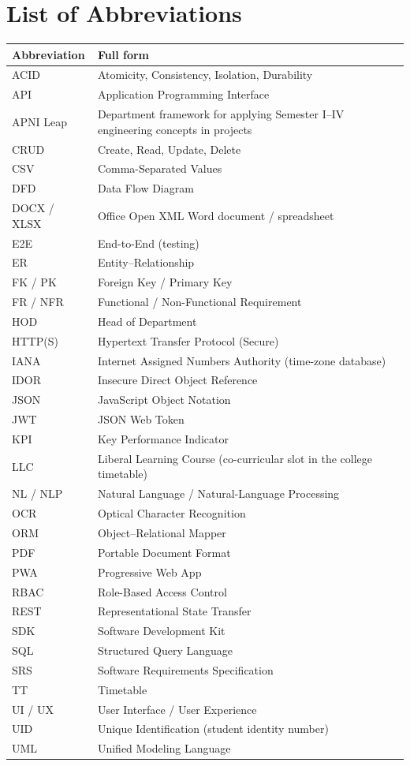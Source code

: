 \section*{List of Abbreviations}
\begin{longtable}{@{}p{}p{}@{}}
\toprule
\textbf{Abbreviation} & \textbf{Full form}\\
\midrule
\endhead
ACID & Atomicity, Consistency, Isolation, Durability\\
API & Application Programming Interface\\
APNI Leap & Department framework for applying Semester I--IV engineering concepts in projects\\
CRUD & Create, Read, Update, Delete\\
CSV & Comma-Separated Values\\
DFD & Data Flow Diagram\\
DOCX / XLSX & Office Open XML Word document / spreadsheet\\
E2E & End-to-End (testing)\\
ER & Entity--Relationship\\
FK / PK & Foreign Key / Primary Key\\
FR / NFR & Functional / Non-Functional Requirement\\
HOD & Head of Department\\
HTTP(S) & Hypertext Transfer Protocol (Secure)\\
IANA & Internet Assigned Numbers Authority (time-zone database)\\
IDOR & Insecure Direct Object Reference\\
JSON & JavaScript Object Notation\\
JWT & JSON Web Token\\
KPI & Key Performance Indicator\\
LLC & Liberal Learning Course (co-curricular slot in the college timetable)\\
NL / NLP & Natural Language / Natural-Language Processing\\
OCR & Optical Character Recognition\\
ORM & Object--Relational Mapper\\
PDF & Portable Document Format\\
PWA & Progressive Web App\\
RBAC & Role-Based Access Control\\
REST & Representational State Transfer\\
SDK & Software Development Kit\\
SQL & Structured Query Language\\
SRS & Software Requirements Specification\\
TT & Timetable\\
UI / UX & User Interface / User Experience\\
UID & Unique Identification (student identity number)\\
UML & Unified Modeling Language\\
\bottomrule
\end{longtable}
